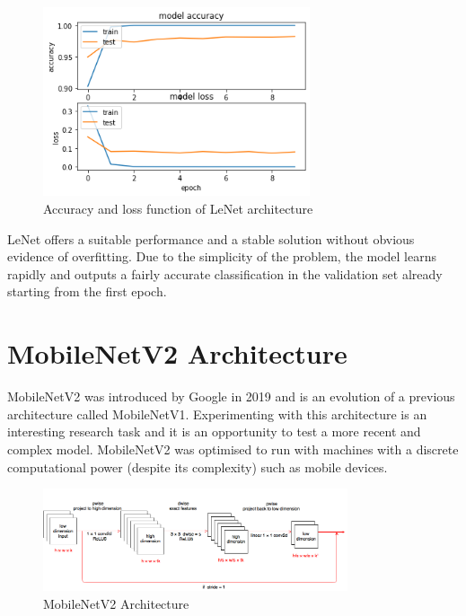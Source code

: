 \documentclass[10pt,english, openany]{book}
\begin{document}
\begin{figure}[H]
    \centering
    \includegraphics[width=0.7\textwidth]{Images/3.2. Accuracy loss Lenet.png}
    \caption{Accuracy and loss function of LeNet architecture}
\end{figure}

LeNet offers a suitable performance and a stable solution without obvious evidence of overfitting. Due to the simplicity of the problem, the model learns rapidly and outputs a fairly accurate classification in the validation set already starting from the first epoch.

\section{MobileNetV2 Architecture}

MobileNetV2 was introduced by Google in 2019 and is an evolution of a previous architecture called MobileNetV1. Experimenting with this architecture is an interesting research task and it is an opportunity to test a more recent and complex model. MobileNetV2 was optimised to run with machines with a discrete computational power (despite its complexity) such as mobile devices.

\begin{figure}[H]
    \centering
    \includegraphics[width=0.8\textwidth]{Images/MobileNetV2.png}
    \caption{MobileNetV2 Architecture}
\end{figure}
\end{document}
